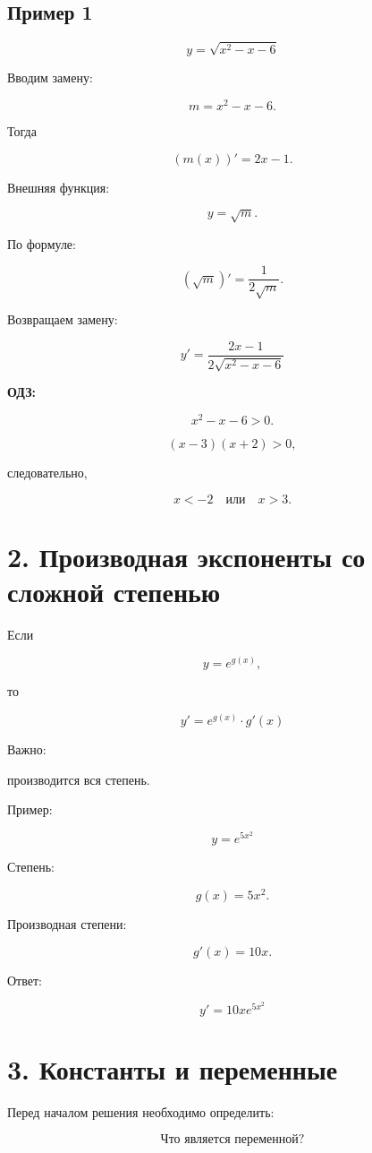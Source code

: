 \documentclass[a4paper,12pt]{article}
\begin{document}
\subsection*{Пример 1}

\[
y=\sqrt{x^2-x-6}
\]

Вводим замену:

\[
m=x^2-x-6.
\]

Тогда

\[
(m(x))'=2x-1.
\]

Внешняя функция:

\[
y=\sqrt m.
\]

По формуле:

\[
(\sqrt m)'=\frac1{2\sqrt m}.
\]

Возвращаем замену:

\[
\boxed{
y'=\frac{2x-1}{2\sqrt{x^2-x-6}}
}
\]

\textbf{ОДЗ:}

\[
x^2-x-6>0.
\]

\[
(x-3)(x+2)>0,
\]

следовательно,

\[
x<-2\quad\text{или}\quad x>3.
\]

\section*{2. Производная экспоненты со сложной степенью}

Если

\[
y=e^{g(x)},
\]

то

\[
\boxed{
y'=e^{g(x)}\cdot g'(x)
}
\]

Важно:

производится вся степень.

Пример:

\[
y=e^{5x^2}
\]

Степень:

\[
g(x)=5x^2.
\]

Производная степени:

\[
g'(x)=10x.
\]

Ответ:

\[
\boxed{
y'=10xe^{5x^2}
}
\]

\section*{3. Константы и переменные}

Перед началом решения необходимо определить:

\[
\boxed{\text{Что является переменной?}}
\]
\end{document}
